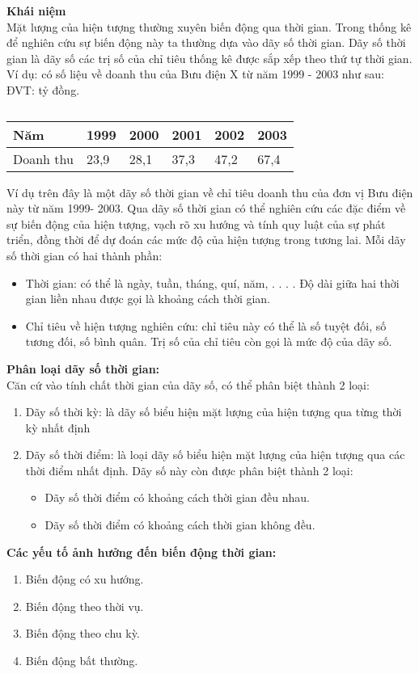 \textbf{Khái niệm} \\
Mặt lượng của hiện tượng thường xuyên biến động qua thời gian. Trong thống kê để nghiên cứu sự biến động này ta thường dựa vào dãy số thời gian.
Dãy số thời gian là dãy số các trị số của chỉ tiêu thống kê được sắp xếp theo thứ tự thời gian.
Ví dụ: có số liệu về doanh thu của Bưu điện X từ năm 1999 - 2003 như sau: ĐVT: tỷ đồng. \\
\begin{table}[H]
	\begin{tabularx}{\textwidth}{X | X | X | X | X | X } 
		Năm		& 1999  & 2000  & 2001  & 2002  & 2003  		\\ \hline
		Doanh thu   & 23,9 & 28,1   & 37,3  & 47,2   	&67,4	   %
	\end{tabularx}
	\label{tab:table1}
	\caption{}
\end{table}


Ví dụ trên đây là một dãy số thời gian về chỉ tiêu doanh thu của đơn vị Bưu điện này từ năm 1999- 2003. Qua dãy số thời gian có thể nghiên cứu các đặc điểm về sự biến động của hiện tượng, vạch rõ xu hướng và tính quy luật của sự phát triển, đồng thời để dự đoán các mức độ của hiện tượng trong tương lai.
Mỗi dãy số thời gian có hai thành phần:
\begin{itemize}
    \item Thời gian: có thể là ngày, tuần, tháng, quí, năm, . . . . Độ dài giữa hai thời gian liền nhau được gọi là khoảng cách thời gian.
    \item Chỉ tiêu về hiện tượng nghiên cứu: chỉ tiêu này có thể là số tuyệt đối, số tương đối, số bình quân. Trị số của chỉ tiêu còn gọi là mức độ của dãy số.
\end{itemize}

\textbf{Phân loại dãy số thời gian:} \\
Căn cứ vào tính chất thời gian của dãy số, có thể phân biệt thành 2 loại:
\begin{enumerate}
    \item Dãy số thời kỳ: là dãy số biểu hiện mặt lượng của hiện tượng qua từng thời kỳ nhất định
    \item Dãy số thời điểm: là loại dãy số biểu hiện mặt lượng của hiện tượng qua các thời điểm nhất định. Dãy số này còn được phân biệt thành 2 loại:
    \begin{itemize}
        \item Dãy số thời điểm có khoảng cách thời gian đều nhau.
        \item Dãy số thời điểm có khoảng cách thời gian không đều.
    \end{itemize}
\end{enumerate}


\textbf{Các yếu tố ảnh hưởng đến biến động thời gian:} \\
\begin{enumerate}
    \item Biến động có xu hướng.
    \item Biến động theo thời vụ.
    \item Biến động theo chu kỳ.
    \item Biến động bất thường.
\end{enumerate}

